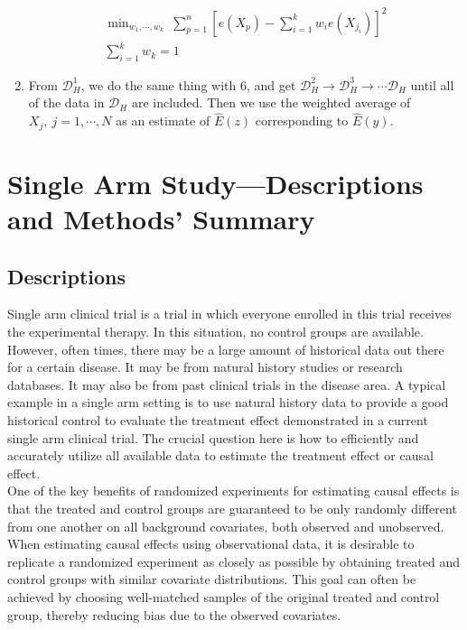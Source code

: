 \documentclass{article}
\begin{document}
\begin{enumerate}
\begin{gather*}
\mathop{\text{min}}_{w_{1},\cdots,w_{k}}~\sum^{n}_{p=1}[e(X_{p})-\sum^{k}_{i=1}w_{i}e(X_{j_{i}})]^{2}\\
\sum^{k}_{i=1}w_{k}=1
\end{gather*}
\item From $\mathscr{D}^{1}_{H}$, we do the same thing with 6, and get $\mathscr{D}^{2}_{H}\rightarrow\mathscr{D}^{3}_{H}\rightarrow\cdots\mathscr{D}_{H}$ until all of the data in $\mathscr{D}_{H}$ are included. Then we use the weighted average of $X_{j},~j=1,\cdots,N$ as an estimate of $\hat{E}(z)$ corresponding to $\hat{E}(y)$.
\end{enumerate}


\hrulefill{}\hrulefill
\section{Single Arm Study---Descriptions and Methods' Summary}
\subsection{Descriptions}
Single arm clinical trial is a trial in which everyone enrolled in this trial receives the experimental therapy. In this situation, no control groups are available. However, often times, there may be a large amount of historical data out there for a certain disease. It may be from natural history studies or research databases. It may also be from past clinical trials in the disease area. A typical example in a single arm setting is to use natural history data to provide a good historical control to evaluate the treatment effect demonstrated in a current single arm clinical trial. The crucial question here is how to efficiently and accurately utilize all available data to estimate the treatment effect or causal effect.\\
One of the key benefits of randomized experiments for estimating causal effects is that the treated and control groups are guaranteed to be only randomly different from one another on all background covariates, both observed and unobserved. When estimating causal effects using observational data, it is desirable to replicate a randomized experiment as closely as possible by obtaining treated and control groups with similar covariate distributions. This goal can often be achieved by choosing well-matched samples of the original treated and control group, thereby reducing bias due to the observed covariates. \par
\end{document}
